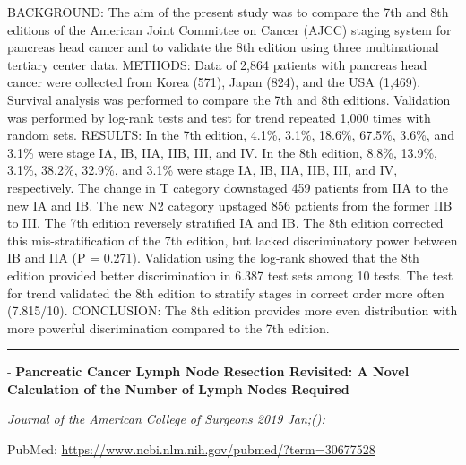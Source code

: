 \documentclass[]{article}
\begin{document}
BACKGROUND: The aim of the present study was to compare the 7th and 8th
editions of the American Joint Committee on Cancer (AJCC) staging system
for pancreas head cancer and to validate the 8th edition using three
multinational tertiary center data. METHODS: Data of 2,864 patients with
pancreas head cancer were collected from Korea (571), Japan (824), and
the USA (1,469). Survival analysis was performed to compare the 7th and
8th editions. Validation was performed by log-rank tests and test for
trend repeated 1,000 times with random sets. RESULTS: In the 7th
edition, 4.1\%, 3.1\%, 18.6\%, 67.5\%, 3.6\%, and 3.1\% were stage IA,
IB, IIA, IIB, III, and IV. In the 8th edition, 8.8\%, 13.9\%, 3.1\%,
38.2\%, 32.9\%, and 3.1\% were stage IA, IB, IIA, IIB, III, and IV,
respectively. The change in T category downstaged 459 patients from IIA
to the new IA and IB. The new N2 category upstaged 856 patients from the
former IIB to III. The 7th edition reversely stratified IA and IB. The
8th edition corrected this mis-stratification of the 7th edition, but
lacked discriminatory power between IB and IIA (P = 0.271). Validation
using the log-rank showed that the 8th edition provided better
discrimination in 6.387 test sets among 10 tests. The test for trend
validated the 8th edition to stratify stages in correct order more often
(7.815/10). CONCLUSION: The 8th edition provides more even distribution
with more powerful discrimination compared to the 7th edition.

{}

{}

\begin{center}\rule{0.5\linewidth}{\linethickness}\end{center}

 - \textbf{Pancreatic Cancer Lymph Node Resection Revisited: A Novel
Calculation of the Number of Lymph Nodes Required}

\emph{Journal of the American College of Surgeons 2019 Jan;():}

PubMed: \url{https://www.ncbi.nlm.nih.gov/pubmed/?term=30677528}
\end{document}
